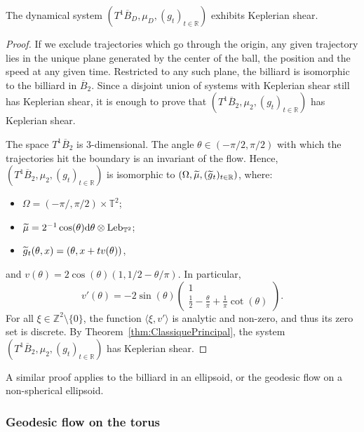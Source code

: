 \documentclass[10pt]{amsart}
\theoremstyle{definition}\newtheorem{defi}[theo]{Definition}\newtheorem{rema}[theo]{Remark}\newtheorem{exam}[theo]{Example}\newtheorem{exem}[theo]{Example}\newtheorem{nota}[theo]{Notation}
\DeclareMathOperator{\Leb}{Leb}
\newcommand{\Z}{\mathbb{Z}}
\newcommand{\R}{\mathbb{R}}
\newcommand{\Tbb}{\mathbb{T}}
\newcommand{\de}{{\rm d}}
\let\oldtilde\tilde
\renewcommand*{\tilde}[1]{\mathchoice{\widetilde{#1}}{\widetilde{#1}}{\oldtilde{#1}}{\oldtilde{#1}}}\let\oldhat\hat
\renewcommand*{\hat}[1]{\mathchoice{\widehat{#1}}{\widehat{#1}}{\oldhat{#1}}{\oldhat{#1}}}\let\oldforall\forall
\renewcommand*{\forall}{\mathrel{\oldforall}}
\begin{document}
\begin{prop}
The dynamical system $(T^1 \overline{B}_D, \mu_D, (g_t)_{t \in \R})$ exhibits Keplerian shear.
\end{prop}


\begin{proof}%
If we exclude trajectories which go through the origin, any given trajectory lies in the unique plane generated by the center of the ball, the position and the speed at any given time. Restricted to any such plane, the billiard is isomorphic to the billiard in $\overline{B}_2$. Since a disjoint union of systems with Keplerian shear still has Keplerian shear, it is enough to prove that $(T^1 \overline{B}_2, \mu_2, (g_t)_{t \in \R})$ has Keplerian shear.


The space $T^1 \overline{B}_2$ is $3$-dimensional. The angle $\theta \in (-\pi/2, \pi/2)$ with which the trajectories hit the boundary is an invariant of the flow. Hence, $(T^1 \overline{B}_2, \mu_2, (g_t)_{t \in \R})$ is isomorphic to $(\Omega, \tilde{\mu}, (\tilde{g}_t)_{t \in \R})$, where:
\begin{itemize}
\item $\Omega = (-\pi/, \pi/2) \times \Tbb^2$;
\item $\tilde{\mu} = 2^{-1}\cos(\theta) \de \theta \otimes \Leb_{\Tbb^2}$;
\item $\tilde{g}_t (\theta,x) = (\theta, x+tv(\theta))$,
\end{itemize}
and $v (\theta) = 2 \cos (\theta) (1, 1/2-\theta/\pi)$. In particular,
\[
v' (\theta) = - 2 \sin (\theta)
\begin{pmatrix} 1 \\ \frac{1}{2}-\frac{\theta}{\pi} + \frac{1}{\pi} \cot (\theta)
\end{pmatrix}.
\]
For all $\xi \in \Z^2 \setminus \{0\}$, the function $\langle \xi, v' \rangle$ is analytic and non-zero, and thus its zero set is discrete. By Theorem~\ref{thm:ClassiquePrincipal}, the system $(T^1 \overline{B}_2, \mu_2, (g_t)_{t \in \R})$ has Keplerian shear.
\end{proof}



A similar proof applies to the billiard in an ellipsoid, or the geodesic flow on a non-spherical ellipsoid.



\subsubsection{Geodesic flow on the torus}\label{subsubsec:FlotTM}
\end{document}
